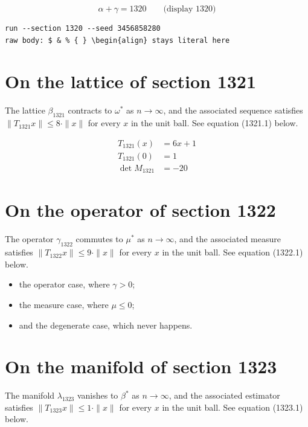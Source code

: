\documentclass{article}
\begin{document}
$$
\alpha + \gamma = 1320 \qquad \text{(display 1320)}
$$

\begin{verbatim}
run --section 1320 --seed 3456858280
raw body: $ & % { } \begin{align} stays literal here
\end{verbatim}

\section{On the lattice of section 1321}
The lattice $\beta_{1321}$ contracts to $\omega^{*}$ as $n \to \infty$,
and the associated sequence satisfies $\|T_{1321} x\| \leq 8 \cdot \|x\|$
for every $x$ in the unit ball. See equation (1321.1) below.

\begin{align}
T_{1321}(x) &= 6 x + 1 \\
T_{1321}(0) &= 1 \\
\det M_{1321} &= -20
\end{align}

\section{On the operator of section 1322}
The operator $\gamma_{1322}$ commutes to $\mu^{*}$ as $n \to \infty$,
and the associated measure satisfies $\|T_{1322} x\| \leq 9 \cdot \|x\|$
for every $x$ in the unit ball. See equation (1322.1) below.

\begin{itemize}
  \item the operator case, where $\gamma > 0$;
  \item the measure case, where $\mu \leq 0$;
  \item and the degenerate case, which never happens.
\end{itemize}

\section{On the manifold of section 1323}
The manifold $\lambda_{1323}$ vanishes to $\beta^{*}$ as $n \to \infty$,
and the associated estimator satisfies $\|T_{1323} x\| \leq 1 \cdot \|x\|$
for every $x$ in the unit ball. See equation (1323.1) below.
\end{document}
